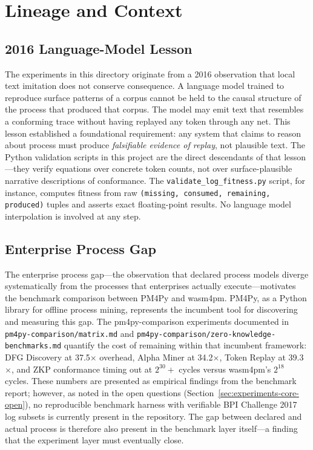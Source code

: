 
\section{Lineage and Context}
\label{sec:experiments-core-lineage}

\subsection{2016 Language-Model Lesson}
\label{sec:experiments-core-lineage-2016}

The experiments in this directory originate from a 2016 observation that local text
imitation does not conserve consequence. A language model trained to reproduce surface
patterns of a corpus cannot be held to the causal structure of the process that
produced that corpus. The model may emit text that resembles a conforming trace without
having replayed any token through any net. This lesson established a foundational
requirement: any system that claims to reason about process must produce \emph{falsifiable
evidence of replay}, not plausible text. The Python validation scripts in this project
are the direct descendants of that lesson---they verify equations over concrete token
counts, not over surface-plausible narrative descriptions of conformance. The
\texttt{validate\_log\_fitness.py} script, for instance, computes fitness from raw
\texttt{(missing, consumed, remaining, produced)} tuples and asserts exact floating-point
results. No language model interpolation is involved at any step.

\subsection{Enterprise Process Gap}
\label{sec:experiments-core-lineage-enterprise}

The enterprise process gap---the observation that declared process models diverge
systematically from the processes that enterprises actually execute---motivates the
benchmark comparison between PM4Py and wasm4pm. PM4Py, as a Python library for
offline process mining, represents the incumbent tool for discovering and measuring
this gap. The pm4py-comparison experiments documented in
\texttt{pm4py-comparison/matrix.md} and \texttt{pm4py-comparison/zero-knowledge-benchmarks.md}
quantify the cost of remaining within that incumbent framework: DFG Discovery at
37.5$\times$ overhead, Alpha Miner at 34.2$\times$, Token Replay at 39.3$\times$,
and ZKP conformance timing out at $2^{30}+$ cycles versus wasm4pm's $2^{18}$ cycles.
These numbers are presented as empirical findings from the benchmark report; however,
as noted in the open questions (Section~\ref{sec:experiments-core-open}), no
reproducible benchmark harness with verifiable BPI Challenge 2017 log subsets is
currently present in the repository. The gap between declared and actual process is
therefore also present in the benchmark layer itself---a finding that the experiment
layer must eventually close.

